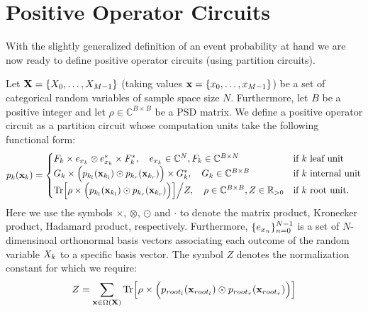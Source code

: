 \section{Positive Operator Circuits}
\label{sec:pocs}
With the slightly generalized definition of an event probability at hand we are now ready to define positive operator circuits (using partition circuits).
\begin{definition}
	\label{def:poc}
	Let $\mathbf{X}=\{X_0,\dots ,X_{M-1}  \}$ (taking values  $\mathbf{x}=\{x_0,\dots ,x_{M-1}  \}$) be a set of categorical random variables of sample space size $N$. Furthermore, let $B$ be a positive integer and let $\rho \in \mathbb{C}^{B\times B}$ be a PSD matrix.
	We define a positive operator circuit as a partition circuit whose computation units take the following functional form:
	\begin{align}
		{\circuit}_k(\xvars_k)=
		\begin{cases}
			F_{k} \times  e_{\xvar_k} \otimes  e^*_{\xvar_k} \times F_{k}^*,
			\quad e_{\xvar_k} \in  \mathbb{C}^{N},  F_{k} \in \mathbb{C}^{B\times N}
			 & \text{if $k$ leaf unit}
			\\
			G_k \times \Bigl( \circuit_{k_l}(\xvars_{k_l}) \odot  \circuit_{k_r} (\xvars_{k_r}) \Bigr) \times G_{k}^*,
			\quad G_k \in \mathbb{C}^{B\times B}
			 & \text{if $k$ internal unit}
			\\
			\Trace \Bigl[  \rho \times \Bigl( \circuit_{k_l}(\xvars_{k_l}) \odot  \circuit_{k_r} (\xvars_{k_r}) \Bigr)  \Bigr] \Big/ Z  ,
			\quad \rho \in \mathbb{C}^{B\times B},Z \in \mathbb{R}_{>0}
			 & \text{if $k$ root unit.}
		\end{cases}
		\label{eq:poc:def}
	\end{align}
	Here we use the symbols $\times$, $\otimes$, $\odot$ and $\cdot$ to denote the matrix product, Kronecker product, Hadamard product, respectively.
	Furthermore, $\{e_{x_n} \}_{n=0}^{N-1}$ is a set of $N$-dimensinoal orthonormal basis vectors associating each outcome of the random variable $X_k$ to a specific basis vector.
	The symbol $Z$ denotes the normalization constant for which we require:
	\begin{align}
		Z
		=
		\sum_{\xvars \in \Omega(\Xvars)}
		\Trace \Bigl[  \rho \times \Bigl( \circuit_{root_l}(\xvars_{root_l}) \odot  \circuit_{root_r} (\xvars_{root_r}) \Bigr)  \Bigr]
	\end{align}


\end{definition}




